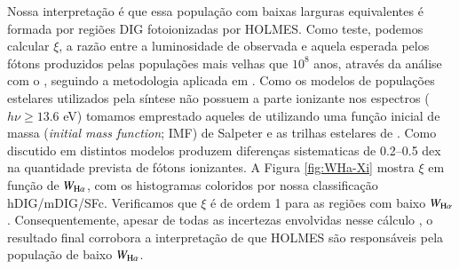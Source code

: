 
Nossa interpretação é que essa população com baixas larguras equivalentes é formada por regiões DIG fotoionizadas por HOLMES. Como teste, podemos calcular $\xi$, a razão entre a luminosidade de \Ha observada e aquela esperada pelos fótons produzidos pelas populações mais velhas que $10^8$ anos, através da análise com o \starlight, seguindo a metodologia aplicada em \citet{CidFernandes.etal.2011a}. Como os modelos de populações estelares utilizados pela síntese \citep{Gonzalezdelgado2005, Vazdekis2010} não possuem a parte ionizante nos espectros ($h\nu \ge 13.6$ eV) tomamos emprestado aqueles de \citet{Bruzual.Charlot.2003} utilizando uma função inicial de massa ({\em initial mass function}; IMF) de Salpeter e as trilhas estelares de \citet{Girardi2000}. Como discutido em \citet{CidFernandes.etal.2011a} distintos modelos produzem diferenças sistematicas de 0.2--0.5 dex na quantidade  prevista de fótons ionizantes. A Figura \ref{fig:WHa-Xi} mostra $\xi$ em função de $W_{\Ha}$, com os histogramas coloridos por nossa classificação hDIG/mDIG/SFc. Verificamos que $\xi$ é de ordem 1 para as regiões com baixo $W_{\Ha}$. Consequentemente, apesar de todas as incertezas envolvidas nesse cálculo \citep{CidFernandes.etal.2011a, Belfiore.etal.2016, Morisset.etal.2016}, o resultado final corrobora a interpretação de que HOLMES são responsáveis pela população de baixo $W_{\Ha}$.


